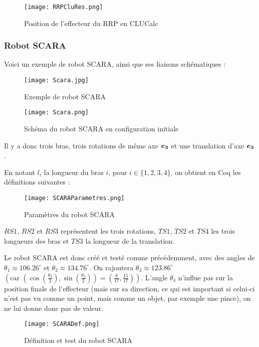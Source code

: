 \begin{figure}[!ht]
\centering
\texttt{[image: RRPCluRes.png]}
\caption{Position de l'effecteur du RRP en CLUCalc}
\end{figure}

\subsubsection{Robot SCARA }

Voici un exemple de robot SCARA, ainsi que ses liaisons schématiques : 

\begin{figure}[!ht]
    \begin{minipage}[c]{.46\linewidth}
        \centering
        \texttt{[image: Scara.jpg]}
        \caption{Exemple de robot SCARA}
    \end{minipage}
    \hfill%
    \begin{minipage}[c]{.46\linewidth}
        \centering
        \texttt{[image: Scara.png]}
        \caption{Schéma du robot SCARA en configuration initiale}
    \end{minipage}
\end{figure}


Il y a donc trois bras, trois rotations de même axe $\bm{e_{3}}$ et une translation d'axe $\bm{e_{3}}$. 

En notant $l_i$ la longueur du bras $i$, pour $i\in \lbrace 1,2,3, 4 \rbrace$, on obtient en Coq les définitions suivantes : 

\begin{figure}[!ht]
\centering
\texttt{[image: SCARAParametres.png]}
\caption{Paramètres du robot SCARA}
\end{figure}

$RS1$, $RS2$ et $RS3$ représentent les trois rotations, $TS1$, $TS2$ et $TS4$ les trois longueurs des bras et $TS3$ la longueur de la translation.

Le robot SCARA est donc créé et testé comme précédemment, avec des angles de $\theta_1 \approx 106.26 ^{\circ}$ et $\theta_2 \approx 134.76 ^{\circ}$. On rajoutera $\theta_3 \approx 123.86^\circ$ $\left( \text{car }\left(\cos \left(\frac{\theta_3}{2} \right), \sin \left(\frac{\theta_3}{2} \right) \right) = \left(\frac{8}{17}, \frac{15}{17} \right)\right) $. L'angle $\theta_4$ n'influe pas sur la position finale de l'effecteur (mais sur sa direction, ce qui est important si celui-ci n'est pas vu comme un point, mais comme un objet, par exemple une pince), on ne lui donne donc pas de valeur. 
\begin{figure}[!ht]
\centering
\texttt{[image: SCARADef.png]}
\caption{Définition et test du robot SCARA}
\end{figure}


